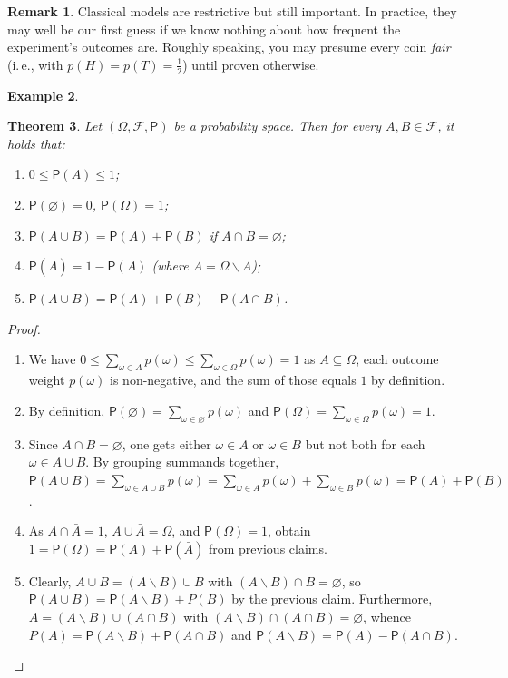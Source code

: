 \documentclass[12pt,notitlepage]{article}
\theoremstyle{plain}
\newtheorem{thm}{Theorem}[section]
\theoremstyle{definition}
\newtheorem{exm}[thm]{Example}
\newtheorem{rem}[thm]{Remark}
\theoremstyle{plain}
\newcommand{\sbs}{\subseteq}
\renewcommand{\setminus}{\smallsetminus}
\newcommand{\void}{\varnothing}
\newcommand{\1}{\mathbf{1}}
\newcommand{\0}{\mathbf{0}}
\newcommand{\mF}{\mathcal{F}}
\renewcommand{\P}{\mathsf{P}}
\newcommand{\mcomm}[1]{}
\begin{document}
\begin{rem}
Classical models are restrictive but still important. In practice, they may well be our first guess if we know nothing about how frequent the experiment's outcomes are. Roughly speaking, you may presume every coin \emph{fair} (i.\,e., with $p(H) = p(T) = \frac{1}{2}$) until proven otherwise.
\end{rem}
\mcomm{Here goes that joke about equiprobability: \emph{What are the chances to come across a dinosaur on the street? One out of two for you either meet it or not!}}

\begin{exm}

\end{exm}


\begin{thm}\label{prob:prob_prop}
Let $(\Omega, \mF, \P)$ be a probability space. Then for every $A, B \in \mF$, it holds that:
\begin{enumerate}
\item $0 \leq \P(A) \leq 1$;
\item $\P(\void) = 0$, $\P(\Omega) = 1$;
\item $\P(A \cup B) = \P(A) + \P(B)$ if $A \cap B = \void$;
\item $\P(\bar A) = 1 - \P(A)$ (where $\bar A = \Omega \setminus A$);
\item $\P(A \cup B) = \P(A) + \P(B) - \P(A \cap B)$.
\end{enumerate}
\end{thm}
\begin{proof}\phantom{x}
\begin{enumerate}
\item We have $0 \leq \sum_{\omega \in A} p(\omega) \leq \sum_{\omega \in \Omega} p(\omega) = 1$ as $A \sbs \Omega$, each outcome weight $p(\omega)$ is non-negative, and the sum of those equals $1$ by definition.
\item By definition, $\P(\void) = \sum_{\omega \in \void} p(\omega)$ and $\P(\Omega) = \sum_{\omega \in \Omega} p(\omega) = 1$.
\item Since $A \cap B = \void$, one gets either $\omega \in A$ or $\omega \in B$ but not both for each $\omega \in A \cup B$. By grouping summands together, $\P(A \cup B) = \sum_{\omega \in A \cup B} p(\omega) = \sum_{\omega \in A} p(\omega) + \sum_{\omega \in B} p(\omega) = \P(A) + \P(B)$.
\item As $A \cap \bar A = 1$, $A \cup \bar A = \Omega$, and $\P(\Omega) = 1$, obtain $1 = \P(\Omega) = \P(A) + \P(\bar A)$ from previous claims.
\item Clearly, $A \cup B = (A \setminus B) \cup B$ with $(A \setminus B) \cap B = \void$, so $\P(A \cup B) = \P(A \setminus B) + P(B)$ by the previous claim. Furthermore, $A = (A \setminus B) \cup (A \cap B)$ with $(A \setminus B) \cap (A \cap B) = \void$, whence $P(A) = \P(A \setminus B) + \P(A \cap B)$ and $\P(A \setminus B) = \P(A) - \P(A \cap B)$.
\end{enumerate}
\end{proof}
\end{document}

